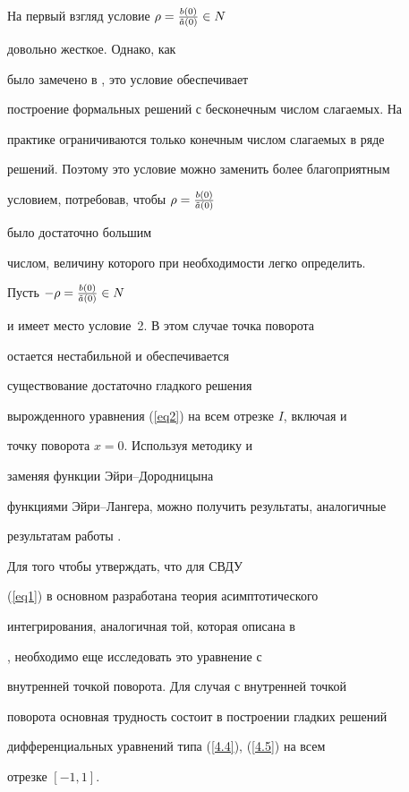 \begin{note}


На первый взгляд условие $\rho =\frac{b(0)}{ \Tilde{a} (0)} \in N $


довольно жесткое. Однако, как


было замечено в \cite{Bobochko1}, это условие обеспечивает


построение формальных решений с бесконечным числом слагаемых. На


практике ограничиваются только конечным числом слагаемых в ряде


решений. Поэтому это условие можно заменить более благоприятным


условием, потребовав, чтобы $\rho =\frac{b(0)}{ \Tilde{a} (0)}$


было достаточно большим


числом, величину которого при необходимости легко определить.


\end{note}








\begin{note}


Пусть $-\rho=\frac{b(0)}{\Tilde{a} (0)}\in N$


и имеет место условие~2. В этом случае точка поворота


остается нестабильной и обеспечивается


существование достаточно гладкого решения


вырожденного уравнения (\ref{eq2}) на всем отрезке $I$, включая и


точку поворота $ x = 0$. Используя методику \cite{Bobochko1} и


заменяя функции Эйри--Дородницына


функциями Эйри--Лангера, можно получить результаты, аналогичные


результатам работы \cite{Bobochko1}.


\end{note}








\begin{note}


Для того чтобы утверждать, что для СВДУ


(\ref{eq1}) в основном разработана теория асимптотического


интегрирования, аналогичная той, которая описана в


\cite{Bobochko3}, необходимо еще исследовать это уравнение с


внутренней точкой поворота. Для случая с внутренней точкой


поворота основная трудность состоит в построении гладких решений


дифференциальных уравнений типа (\ref{4.4}), (\ref{4.5}) на всем


отрезке $[-1,1]$.


\end{note}








